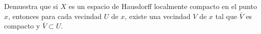 
 \item Demuestra que si $X$ es un espacio de Hausdorff localmente compacto en el punto $x$, entonces para cada vecindad $U$ de $x$, existe una vecindad $V$ de $x$ tal que $\bar{V}$ es compacto y $\bar{V} \subset U$.